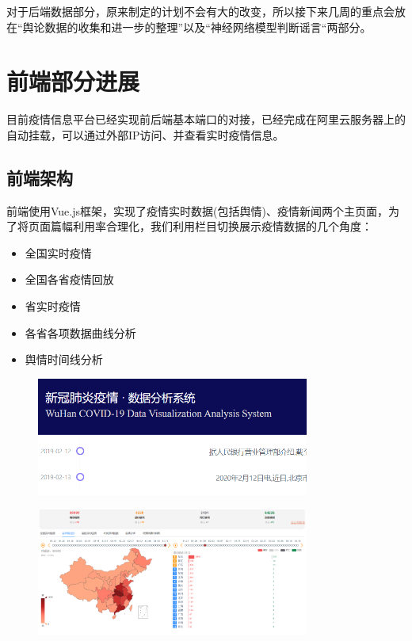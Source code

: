 \documentclass{article}
\begin{document}
对于后端数据部分，原来制定的计划不会有大的改变，所以接下来几周的重点会放在“舆论数据的收集和进一步的整理”以及“神经网络模型判断谣言“两部分。



\section{前端部分进展}
目前疫情信息平台已经实现前后端基本端口的对接，已经完成在阿里云服务器上的自动挂载，可以通过外部IP访问、并查看实时疫情信息。
\subsection{前端架构}
前端使用Vue.js框架，实现了疫情实时数据(包括舆情)、疫情新闻两个主页面，为了将页面篇幅利用率合理化，我们利用栏目切换展示疫情数据的几个角度：
\begin{itemize}
	\item 全国实时疫情
	\item 全国各省疫情回放
	\item 省实时疫情
	\item 各省各项数据曲线分析 
	\item 舆情时间线分析
\end{itemize}
\begin{figure}[htb]
\centering
\includegraphics[width=0.8\textwidth]{pic2.png}
\end{figure}

\begin{figure}[htb]
\centering
\includegraphics[width=0.8\textwidth]{pic3.png}
\end{figure}
\end{document}
